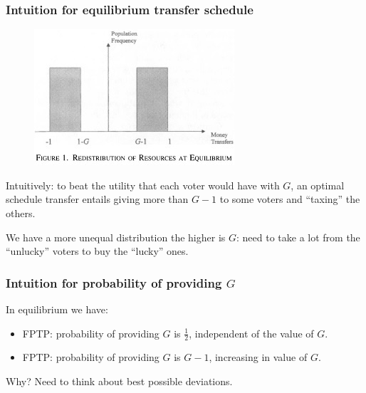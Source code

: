 \documentclass[11pt,aspectratio=169]{beamer}
\begin{document}
\begin{frame}
\frametitle{Intuition for equilibrium transfer schedule}

\begin{figure}[h]
\begin{center}
\includegraphics[scale=0.75]{distribution.jpg}
\end{center}
\end{figure}

\noindent Intuitively: to beat the utility that each voter would have with $G$, an optimal schedule transfer entails giving more than $G-1$ to some voters and ``taxing'' the others.

\bigskip

\noindent We have a more unequal distribution the higher is $G$: need to take a lot from the ``unlucky'' voters to buy the ``lucky'' ones.
\end{frame}


\begin{frame}
\frametitle{Intuition for probability of providing $G$}
\noindent In equilibrium we have:
\begin{itemize}
\item FPTP: probability of providing $G$ is $\frac{1}{2}$, independent of the value of $G$.
\item FPTP: probability of providing $G$ is $G-1$, increasing in value of $G$.
\end{itemize}

\bigskip

\noindent Why? Need to think about best possible deviations.

\end{frame}
\end{document}
